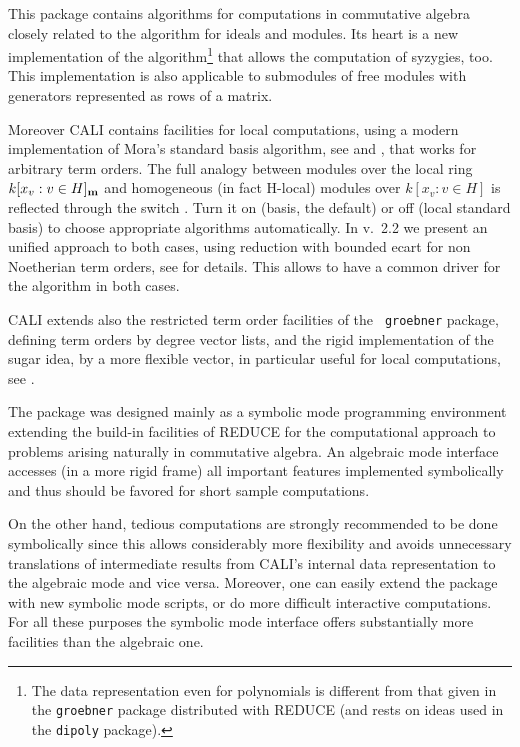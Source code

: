 This package contains algorithms for computations in commutative
algebra closely related to the \gr algorithm for ideals and modules.
Its heart is a new implementation of the \gr algorithm\footnote{The
data representation even for polynomials is different from that given
in the {\tt groebner} package distributed with REDUCE (and rests on ideas
used in the {\tt dipoly} package).} that allows the computation of
syzygies, too. This implementation is also applicable to submodules of
free modules with generators represented as rows of a matrix.

Moreover CALI contains facilities for local computations, using a
modern implementation of Mora's standard basis algorithm, see
\cite{MPT} and \cite{tcah}, that works for arbitrary term orders.
The full analogy between modules over the local ring \linebreak[1]
$k[x_v:v\in H]_{\bf m}$ and homogeneous (in fact H-local) modules
over $k[x_v:v\in H]$ is reflected through the switch
.  Turn it on (\gr basis, the default) or off (local
standard basis) to choose appropriate algorithms
automatically. In v.\ 2.2 we present an unified approach to both
cases, using reduction with bounded ecart for non Noetherian term
orders, see \cite{ala} for details. This allows to have a common
driver for the \gr algorithm in both cases.

CALI extends also the restricted term order facilities of the {\tt
groebner} package, defining term orders by degree vector lists, and 
the rigid implementation of the sugar idea, by a more flexible
 vector, in particular useful for local computations, see
\cite{tcah}. 
\medskip

The package was designed mainly as a symbolic mode programming
environment extending the build-in facilities of REDUCE for the
computational approach to problems arising naturally in commutative
algebra. An algebraic mode interface accesses (in a more rigid frame)
all important features implemented symbolically and thus 
should be favored for short sample computations.

On the other hand, tedious computations are strongly recommended to
be done symbolically since this allows considerably more flexibility
and avoids unnecessary translations of intermediate results from
CALI's internal data representation to the algebraic mode and vice
versa. Moreover, one can easily extend the package with new symbolic
mode scripts, or do more difficult interactive computations. For all
these purposes the symbolic mode interface offers substantially more
facilities than the algebraic one.
\medskip

